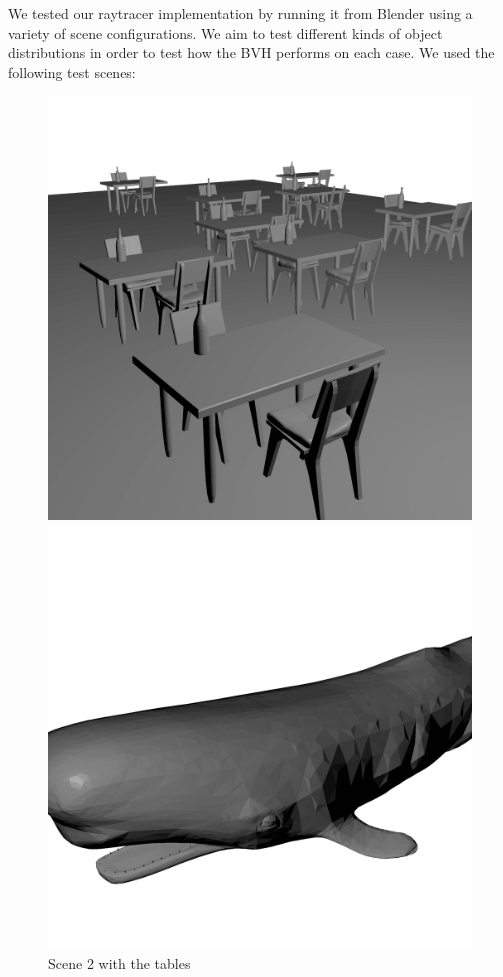 \documentclass{vgtc}
\begin{document}
We tested our raytracer implementation by running it from Blender using
a variety of scene configurations. We aim to test different kinds of
object distributions in order to test how the BVH performs on each
case. We used the following test scenes:

\begin{figure}[!hbt]
\centering
{}%
  \includegraphics[width=\linewidth]{several_kitchen.png}
  \caption{Scene 2 with the tables}\label{fig:tables}
\endminipage
{}
  \includegraphics[width=\linewidth]{whale.png}

\end{figure}
\end{document}
